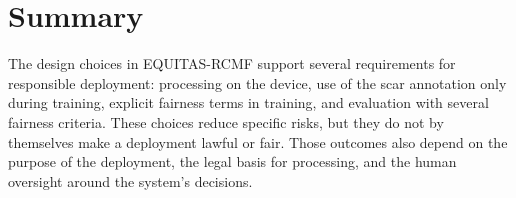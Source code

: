 \section{Summary}
The design choices in EQUITAS-RCMF support several requirements for responsible deployment: processing on the device, use of the scar annotation only during training, explicit fairness terms in training, and evaluation with several fairness criteria. These choices reduce specific risks, but they do not by themselves make a deployment lawful or fair. Those outcomes also depend on the purpose of the deployment, the legal basis for processing, and the human oversight around the system's decisions.
